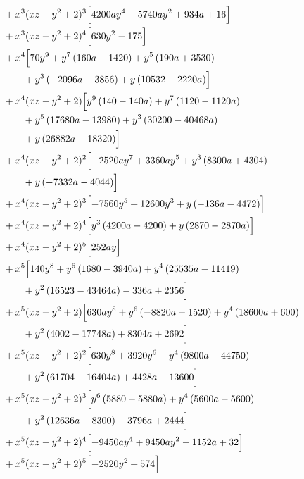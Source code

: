 \begin{align*}
&{}+x^{3}(xz-y^2+2)^{3}\Bigl[4200 a y^{4} - 5740 a y^{2} + 934 a + 16\Bigr]\\
&{}+x^{3}(xz-y^2+2)^{4}\Bigl[630 y^{2} - 175\Bigr]\\
&{}+x^{4}\Bigl[70 y^{9} + y^{7} \left(160 a - 1420\right) + y^{5} \left(190 a + 3530\right)\\
&\qquad + y^{3} \left(- 2096 a - 3856\right) + y \left(10532 - 2220 a\right)\Bigr]\\
&{}+x^{4}(xz-y^2+2)\Bigl[y^{9} \left(140 - 140 a\right) + y^{7} \left(1120 - 1120 a\right)\\
&\qquad + y^{5} \left(17680 a - 13980\right) + y^{3} \left(30200 - 40468 a\right)\\
&\qquad + y \left(26882 a - 18320\right)\Bigr]\\
&{}+x^{4}(xz-y^2+2)^{2}\Bigl[- 2520 a y^{7} + 3360 a y^{5} + y^{3} \left(8300 a + 4304\right)\\
&\qquad + y \left(- 7332 a - 4044\right)\Bigr]\\
&{}+x^{4}(xz-y^2+2)^{3}\Bigl[- 7560 y^{5} + 12600 y^{3} + y \left(- 136 a - 4472\right)\Bigr]\\
&{}+x^{4}(xz-y^2+2)^{4}\Bigl[y^{3} \left(4200 a - 4200\right) + y \left(2870 - 2870 a\right)\Bigr]\\
&{}+x^{4}(xz-y^2+2)^{5}\Bigl[252 a y\Bigr]\\
&{}+x^{5}\Bigl[140 y^{8} + y^{6} \left(1680 - 3940 a\right) + y^{4} \left(25535 a - 11419\right)\\
&\qquad + y^{2} \left(16523 - 43464 a\right) - 336 a + 2356\Bigr]\\
&{}+x^{5}(xz-y^2+2)\Bigl[630 a y^{8} + y^{6} \left(- 8820 a - 1520\right) + y^{4} \left(18600 a + 600\right)\\
&\qquad + y^{2} \left(4002 - 17748 a\right) + 8304 a + 2692\Bigr]\\
&{}+x^{5}(xz-y^2+2)^{2}\Bigl[630 y^{8} + 3920 y^{6} + y^{4} \left(9800 a - 44750\right)\\
&\qquad + y^{2} \left(61704 - 16404 a\right) + 4428 a - 13600\Bigr]\\
&{}+x^{5}(xz-y^2+2)^{3}\Bigl[y^{6} \left(5880 - 5880 a\right) + y^{4} \left(5600 a - 5600\right)\\
&\qquad + y^{2} \left(12636 a - 8300\right) - 3796 a + 2444\Bigr]\\
&{}+x^{5}(xz-y^2+2)^{4}\Bigl[- 9450 a y^{4} + 9450 a y^{2} - 1152 a + 32\Bigr]\\
&{}+x^{5}(xz-y^2+2)^{5}\Bigl[- 2520 y^{2} + 574\Bigr]\\

\end{align*}
